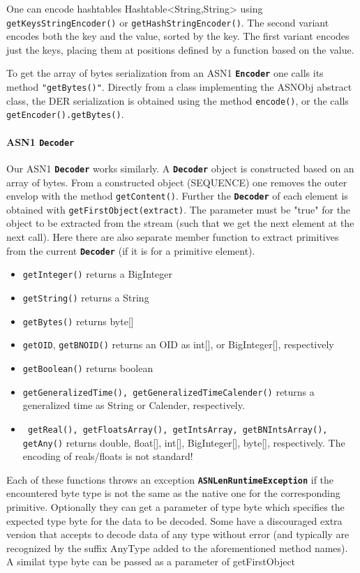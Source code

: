 \documentclass{book}
\newcommand{\cls}[1]{{\tt\bf #1}}
\newcommand{\mth}[1]{{\tt #1}}
\begin{document}
One can encode hashtables Hashtable<String,String> using \mth{getKeysStringEncoder()} or \mth{getHashStringEncoder()}.
The second variant encodes both the key and the value, sorted by the key. The first variant encodes just the keys,
placing them at positions defined by a function based on the value.

To get the array of bytes serialization from an ASN1 \cls{Encoder} one calls its method \mth{"getBytes()"}.
Directly from a class implementing the ASNObj abstract class, the DER serialization is obtained using
the method \mth{encode()}, or the calls \mth{getEncoder().getBytes()}.

\paragraph{ASN1 \cls{Decoder}}
Our ASN1 \cls{Decoder} works similarly. A \cls{Decoder} object is constructed based on an array of bytes. From a constructed object (SEQUENCE)
one removes the outer envelop with the method \mth{getContent()}.
Further the \cls{Decoder} of each element is obtained with \mth{getFirstObject(extract)}. The parameter must be "true" for the object to be extracted from the stream (such that we get the next element at the next call).
Here there are also separate member function to extract primitives from the current \cls{Decoder} (if it is for a primitive element).
\begin{itemize}
\item
\mth{getInteger()} returns a BigInteger
\item
\mth{getString()} returns a String
\item
\mth{getBytes()} returns byte[]
\item
\mth{getOID}, \mth{getBNOID()} returns an OID as int[], or BigInteger[], respectively
\item
\mth{getBoolean()} returns boolean
\item
\mth{getGeneralizedTime(), getGeneralizedTimeCalender()} returns a generalized time as String or Calender, respectively.
\item
\mth{ getReal(), getFloatsArray(), getIntsArray, getBNIntsArray(), getAny()} returns double, float[], int[], BigInteger[], byte[], respectively.
The encoding of reals/floats is not standard!
\end{itemize}
Each of these functions throws an exception \cls{ASNLenRuntimeException} if the encountered byte type is not the same as the native one
for the corresponding primitive. Optionally they can get a parameter of type byte which specifies the expected type byte 
for the data to be decoded. Some have a discouraged extra version that accepts to decode data of any type without error (and
typically are recognized by the suffix AnyType added to the aforementioned method names). A similat type byte can be
passed as a parameter of getFirstObject
\end{document}
